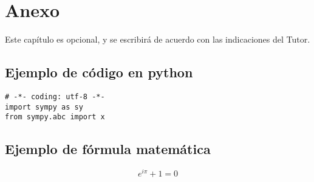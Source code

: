 \chapter*{Anexo}
Este capítulo es opcional, y se escribirá de acuerdo con las indicaciones del Tutor. 


\section{Ejemplo de código en python}
\begin{lstlisting}[style=Python]
# -*- coding: utf-8 -*-
import sympy as sy
from sympy.abc import x
\end{lstlisting}

\section{Ejemplo de fórmula matemática}
$$e^{i \pi} + 1 = 0 $$




 